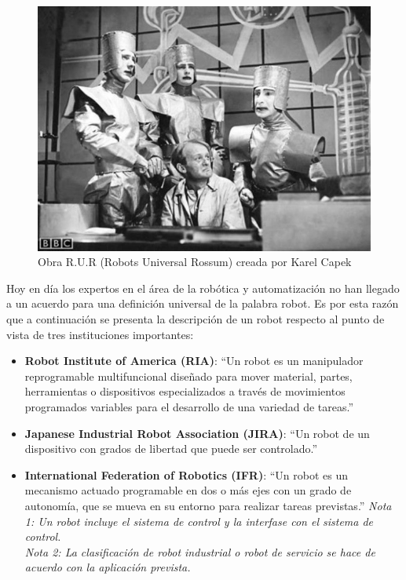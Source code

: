     \begin{figure}[htb]
        \centering
        \includegraphics[width=0.6\linewidth]{Main/Chapter2/Images2/Obra-robots.jpg}
        \caption{Obra R.U.R (Robots Universal Rossum) creada por Karel Capek}
        \label{f:Cap2_general_2}
    \end{figure}
    
    Hoy en día los expertos en el área de la robótica y automatización no han llegado a un acuerdo para una definición universal de la palabra robot. Es por esta razón que a continuación se presenta la descripción de un robot respecto al punto de vista de tres instituciones importantes:
    
    \begin{itemize}
    
        \item \textbf{Robot Institute of America (RIA)}: ``Un robot es un manipulador reprogramable multifuncional diseñado para mover material, partes, herramientas o dispositivos especializados a través de movimientos programados variables para el desarrollo de una variedad de tareas.''
        
        \item \textbf{Japanese Industrial Robot Association (JIRA)}: ``Un robot de un dispositivo con grados de libertad que puede ser controlado.''
        
        \item \textbf{International Federation of Robotics (IFR)}: ``Un robot es un mecanismo actuado programable en dos o más ejes con un grado de autonomía, que se mueva en su entorno para realizar tareas previstas.''
        \textit{Nota 1: Un robot incluye el sistema de control y la interfase con el sistema de control.}\\
        \textit{Nota 2: La clasificación de robot industrial o robot de servicio se hace de acuerdo con la aplicación prevista.}
        
    \end{itemize}
    
